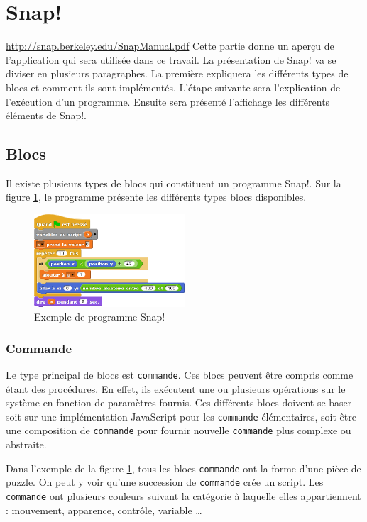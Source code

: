 \section{Snap!}
\url{http://snap.berkeley.edu/SnapManual.pdf} %
Cette partie donne un aperçu de l'application qui sera utilisée dans ce travail. La présentation de Snap! va se diviser en plusieurs paragraphes. La première expliquera les différents types de blocs et comment ils sont implémentés. L'étape suivante sera l'explication de l'exécution d'un programme. Ensuite sera présenté l'affichage les différents éléments de Snap!. %

\subsection{Blocs}
Il existe plusieurs types de blocs qui constituent un programme Snap!. Sur la figure \ref{fig:software-used-script}, le programme présente les différents types blocs disponibles.
\begin{figure}
  \begin{center}
    \includegraphics[width=0.5\textwidth]{content/5-related_work/images/script}
    \caption{Exemple de programme Snap!}
    \label{fig:software-used-script}
  \end{center}
\end{figure}

\subsubsection{Commande}
Le type principal de blocs est \texttt{commande}. Ces blocs peuvent être compris comme étant des procédures. En effet, ils exécutent une ou plusieurs opérations sur le système en fonction de paramètres fournis. Ces différents blocs doivent se baser soit sur une implémentation JavaScript pour les \texttt{commande} élémentaires, soit être une composition de \texttt{commande} pour fournir nouvelle \texttt{commande} plus complexe ou abstraite.

Dans l'exemple de la figure \ref{fig:software-used-script}, tous les blocs \texttt{commande} ont la forme d'une pièce de puzzle. On peut y voir qu'une succession de \texttt{commande} crée un script. Les \texttt{commande} ont plusieurs couleurs suivant la catégorie à laquelle elles appartiennent : mouvement, apparence, contrôle, variable \ldots

